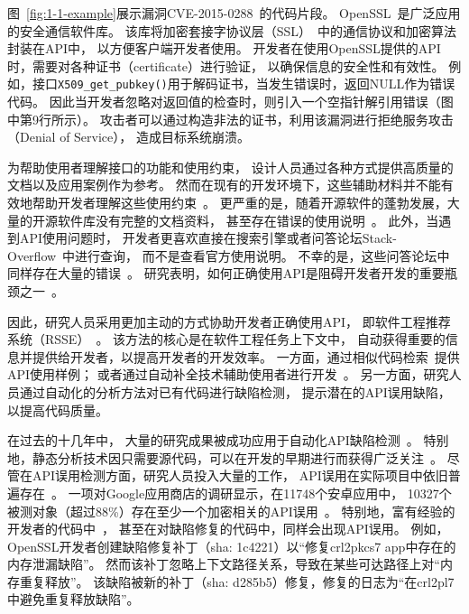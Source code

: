 图~\ref{fig:1-1-example}展示漏洞CVE-2015-0288~\cite{CVE-2015-0288}的代码片段。
OpenSSL~\cite{openssl}是广泛应用的安全通信软件库。
该库将加密套接字协议层（SSL）~\cite{ssl}中的通信协议和加密算法封装在API中，
以方便客户端开发者使用。
开发者在使用OpenSSL提供的API时，需要对各种证书（certificate）进行验证，
以确保信息的安全性和有效性。
例如，接口\texttt{X509\_get\_pubkey()}用于解码证书，当发生错误时，返回NULL作为错误代码。
因此当开发者忽略对返回值的检查时，则引入一个空指针解引用错误（图中第9行所示）。
攻击者可以通过构造非法的证书，利用该漏洞进行拒绝服务攻击（Denial of Service），
造成目标系统崩溃。







为帮助使用者理解接口的功能和使用约束，
设计人员通过各种方式提供高质量的文档以及应用案例作为参考。
然而在现有的开发环境下，这些辅助材料并不能有效地帮助开发者理解这些使用约束~\cite{09-icse-doc}。
更严重的是，随着开源软件的蓬勃发展，大量的开源软件库没有完整的文档资料，
甚至存在错误的使用说明~\cite{15-ieee-doc-fail, 17-icse-api-doc}。
此外，当遇到API使用问题时，
开发者更喜欢直接在搜索引擎或者问答论坛Stack-Overflow~\cite{stackoverflow}中进行查询，
而不是查看官方使用说明。
不幸的是，这些问答论坛中同样存在大量的错误~\cite{16-sp-stack}。
研究表明，如何正确使用API是阻碍开发者开发的重要瓶颈之一~\cite{16-icse-cry}。


因此，研究人员采用更加主动的方式协助开发者正确使用API，
即软件工程推荐系统（RSSE）~\cite{10-ieee-rsse}。
该方法的核心是在软件工程任务上下文中，
自动获得重要的信息并提供给开发者，以提高开发者的开发效率。
一方面，通过相似代码检索~\cite{05-icse-rec,16-icse-doc-stack,14-msr-stack}提供API使用样例；
或者通过自动补全技术辅助使用者进行开发~\cite{15-tosem-code-cplt}。
另一方面，研究人员通过自动化的分析方法对已有代码进行缺陷检测，
提示潜在的API误用缺陷，以提高代码质量。


在过去的十几年中，
大量的研究成果被成功应用于自动化API缺陷检测~\cite{15-coufless-static-survey,18-icse-saful,survey18}。
特别地，静态分析技术因只需要源代码，可以在开发的早期进行而获得广泛关注~\cite{05-icse-static}。
尽管在API误用检测方面，研究人员投入大量的工作，
API误用在实际项目中依旧普遍存在~\cite{16-ase-spec, 18-icse-stack}。
一项对Google应用商店的调研显示，在11748个安卓应用中，
10327个被测对象（超过88\%）存在至少一个加密相关的API误用~\cite{13-ccs-misuse}。
特别地，富有经验的开发者的代码中~\cite{18-soups-api-blind}，
甚至在对缺陷修复的代码中，同样会出现API误用。
例如，OpenSSL开发者创建缺陷修复补丁（sha: 1c4221）以``修复crl2pkcs7 app中存在的内存泄漏缺陷''。
然而该补丁忽略上下文路径关系，导致在某些可达路径上对``内存重复释放''。
该缺陷被新的补丁（sha: d285b5）修复，修复的日志为``在crl2pl7中避免重复释放缺陷''。


